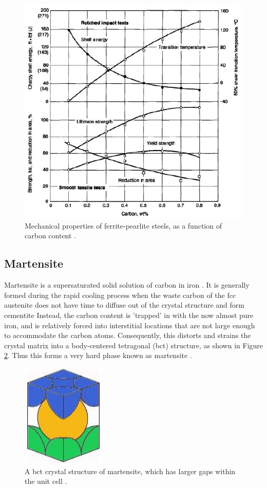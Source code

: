 \documentclass[12pt]{report}
\begin{document}
\begin{figure}[H]
    \centering
    \includegraphics[width=.8\textwidth]{mechanical_properties_of_ferrite-pearlite_steels.jpg}
    \caption{Mechanical properties of ferrite-pearlite steels, as a function of carbon content \cite{molabe2018determining}. }
    \label{ch3:figure:properties}
\end{figure}

\subsection{Martensite}
Martensite is a supersaturated solid solution of carbon in iron \cite{molabe2018determining}. It is generally formed during the rapid cooling process when the waste carbon of the fcc austenite does not have time to diffuse out of the crystal structure and form cementite \cite{bajaj2020steels} Instead, the carbon content is 'trapped' in with the now almost pure iron, and is relatively forced into interstitial locations that are not large enough to accommodate the carbon atoms. Consequently, this distorts and strains the crystal matrix into a body-centered tetragonal (bct) structure, as shown in Figure \ref{ch3:figure:martensite}. Thus this forms a very hard phase known as martensite \cite{molabe2018determining}.
 
\begin{figure}[H]
    \centering
    \includegraphics[width=.25\textwidth]{bct_crystal_structure_of_martensite.jpg}
    \caption{A bct crystal structure of martensite, which has larger gaps within the unit cell \cite{bajaj2020steels}.}
    \label{ch3:figure:martensite}
\end{figure}
\end{document}
